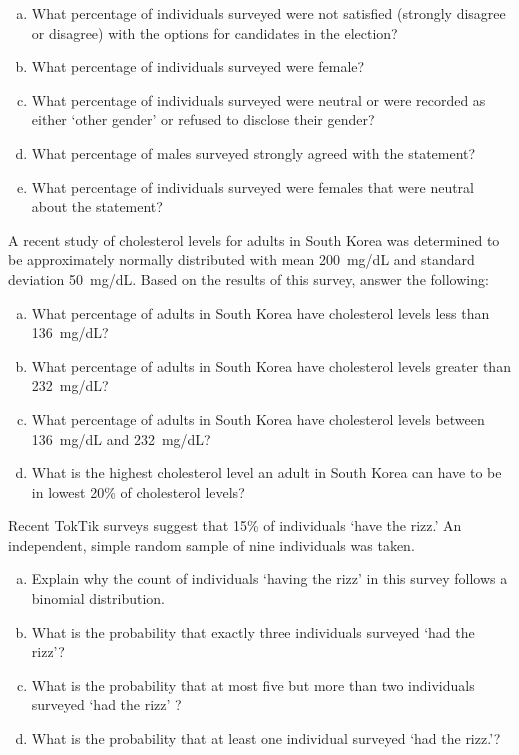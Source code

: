 \documentclass[12pt,letterpaper]{exam}
\begin{document}
\begin{questions}
\begin{enumerate}[(a)]
\item What percentage of individuals surveyed were not satisfied (strongly disagree or disagree) with the options for candidates in the election? 
\item What percentage of individuals surveyed were female?
\item What percentage of individuals surveyed were neutral or were recorded as either `other gender' or refused to disclose their gender?
\item What percentage of males surveyed strongly agreed with the statement?
\item What percentage of individuals surveyed were females that were neutral about the statement?
\end{enumerate}



\newpage
\question[15] A recent study of cholesterol levels for adults in South Korea was determined to be approximately normally distributed with mean 200~mg/dL and standard deviation 50~mg/dL. Based on the results of this survey, answer the following:
        \begin{enumerate}[(a)]
        \item What percentage of adults in South Korea have cholesterol levels less than 136~mg/dL?
        \item What percentage of adults in South Korea have cholesterol levels greater than 232~mg/dL?
        \item What percentage of adults in South Korea have cholesterol levels between 136~mg/dL and 232~mg/dL?
        \item What is the highest cholesterol level an adult in South Korea can have to be in lowest 20\% of cholesterol levels?
        \end{enumerate}



\newpage
\question[15] Recent TokTik surveys suggest that 15\% of individuals `have the rizz.' An independent, simple random sample of nine individuals was taken. 
        \begin{enumerate}[(a)]
        \item Explain why the count of individuals `having the rizz' in this survey follows a binomial distribution. 
        \item What is the probability that exactly three individuals surveyed `had the rizz'?
        \item What is the probability that at most five but more than two individuals surveyed `had the rizz' ?
        \item What is the probability that at least one individual surveyed `had the rizz.'?
        \end{enumerate}




\end{questions}
\end{document}
